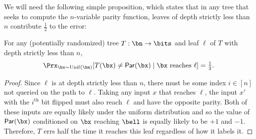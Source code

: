 \documentclass[11pt]{article}
\begin{document}
We will need the following simple proposition, which states that in any tree that seeks to compute the $n$-variable parity function, leaves of depth strictly less than $n$ contribute $\frac1{2}$ to the error:
\begin{proposition}
    \label{prop:par-query-all}
    For any (potentially randomized) tree $T: \bn \to \bits$ and leaf $\ell$ of $T$ with depth strictly less than $n$,
    \begin{equation*}
        \Prx_{\bx \sim \mathrm{Unif}(\bn)}[T(\bx) \neq \mathsf{Par}(\bx) \mid \bx \text{ reaches } \ell] = \tfrac{1}{2}.
    \end{equation*}
\end{proposition}
\begin{proof}
    Since $\ell$ is at depth strictly less than $n$, there must be some index $i \in [n]$ not queried on the path to $\ell$. Taking any input $x$ that reaches $\ell$, the input $x'$ with the $i^{\text{th}}$ bit flipped must also reach $\ell$ and have the opposite parity. Both of these inputs are equally likely under the uniform distribution and so the value of $\mathsf{Par}(\bx)$ conditioned on $\bx$ reaching $\bell$ is equally likely to be $+1$ and $-1$. Therefore, $T$ errs half the time it reaches this leaf regardless of how it labels it.
\end{proof}
\end{document}
